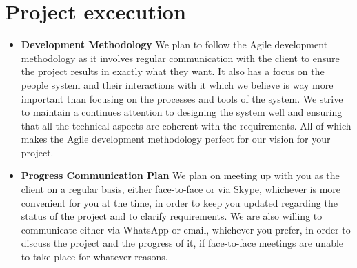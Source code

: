 \documentclass{article}
\begin{document}
	\section{Project excecution}
	\begin{itemize}
		\item \textbf{Development Methodology} \newline \newline
		We plan to follow the Agile development methodology as it involves regular communication with the client to ensure the project results in exactly what they want. It also has a focus on the people system and their interactions with it which we believe is way more important than focusing on the processes and tools of the system. We strive to maintain a continues attention to designing the system well and ensuring that all the technical aspects are coherent with the requirements. All of which makes the Agile development methodology perfect for our vision for your project.
		
		\item \textbf{Progress Communication Plan} \newline \newline
		We plan on meeting up with you as the client on a regular basis, either face-to-face or via Skype, whichever is more convenient for you at the time, in order to keep you updated regarding the status of the project and to clarify requirements. We are also willing to communicate either via WhatsApp or email, whichever you prefer, in order to discuss the project and the progress of it, if face-to-face meetings are unable to take place for whatever reasons.


\end{itemize}
\end{document}
